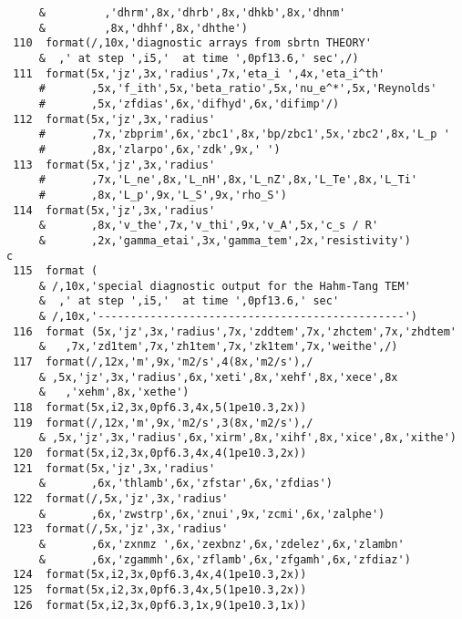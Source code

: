 \begin{verbatim}
     &         ,'dhrm',8x,'dhrb',8x,'dhkb',8x,'dhnm'
     &         ,8x,'dhhf',8x,'dhthe')
 110  format(/,10x,'diagnostic arrays from sbrtn THEORY'
     &  ,' at step ',i5,'  at time ',0pf13.6,' sec',/)
 111  format(5x,'jz',3x,'radius',7x,'eta_i ',4x,'eta_i^th'
     #       ,5x,'f_ith',5x,'beta_ratio',5x,'nu_e^*',5x,'Reynolds'
     #       ,5x,'zfdias',6x,'difhyd',6x,'difimp'/)
 112  format(5x,'jz',3x,'radius'
     #       ,7x,'zbprim',6x,'zbc1',8x,'bp/zbc1',5x,'zbc2',8x,'L_p '
     #       ,8x,'zlarpo',6x,'zdk',9x,' ')
 113  format(5x,'jz',3x,'radius'
     #       ,7x,'L_ne',8x,'L_nH',8x,'L_nZ',8x,'L_Te',8x,'L_Ti'
     #       ,8x,'L_p',9x,'L_S',9x,'rho_S')
 114  format(5x,'jz',3x,'radius'
     &       ,8x,'v_the',7x,'v_thi',9x,'v_A',5x,'c_s / R'
     &       ,2x,'gamma_etai',3x,'gamma_tem',2x,'resistivity')
c
 115  format (
     & /,10x,'special diagnostic output for the Hahm-Tang TEM'
     &  ,' at step ',i5,'  at time ',0pf13.6,' sec'
     & /,10x,'-----------------------------------------------')
 116  format (5x,'jz',3x,'radius',7x,'zddtem',7x,'zhctem',7x,'zhdtem'
     &   ,7x,'zd1tem',7x,'zh1tem',7x,'zk1tem',7x,'weithe',/)
 117  format(/,12x,'m',9x,'m2/s',4(8x,'m2/s'),/
     & ,5x,'jz',3x,'radius',6x,'xeti',8x,'xehf',8x,'xece',8x
     &   ,'xehm',8x,'xethe')
 118  format(5x,i2,3x,0pf6.3,4x,5(1pe10.3,2x))
 119  format(/,12x,'m',9x,'m2/s',3(8x,'m2/s'),/
     & ,5x,'jz',3x,'radius',6x,'xirm',8x,'xihf',8x,'xice',8x,'xithe')
 120  format(5x,i2,3x,0pf6.3,4x,4(1pe10.3,2x))
 121  format(5x,'jz',3x,'radius'
     &       ,6x,'thlamb',6x,'zfstar',6x,'zfdias')
 122  format(/,5x,'jz',3x,'radius'
     &       ,6x,'zwstrp',6x,'znui',9x,'zcmi',6x,'zalphe')
 123  format(/,5x,'jz',3x,'radius'
     &       ,6x,'zxnmz ',6x,'zexbnz',6x,'zdelez',6x,'zlambn'
     &       ,6x,'zgammh',6x,'zflamb',6x,'zfgamh',6x,'zfdiaz')
 124  format(5x,i2,3x,0pf6.3,4x,4(1pe10.3,2x))
 125  format(5x,i2,3x,0pf6.3,4x,5(1pe10.3,2x))
 126  format(5x,i2,3x,0pf6.3,1x,9(1pe10.3,1x))


\end{verbatim}
